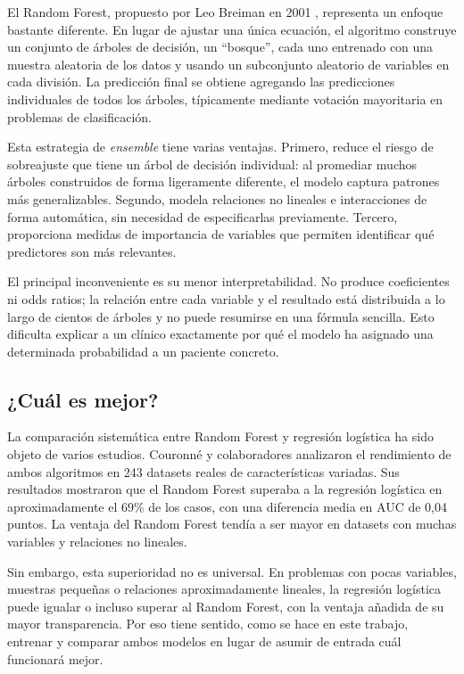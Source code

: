 \documentclass[12pt, a4paper, oneside]{report}
\begin{document}
El Random Forest, propuesto por Leo Breiman en 2001 \parencite{breiman2001rf}, representa un enfoque bastante diferente. En lugar de ajustar una única ecuación, el algoritmo construye un conjunto de árboles de decisión, un ``bosque'', cada uno entrenado con una muestra aleatoria de los datos y usando un subconjunto aleatorio de variables en cada división. La predicción final se obtiene agregando las predicciones individuales de todos los árboles, típicamente mediante votación mayoritaria en problemas de clasificación.

Esta estrategia de \textit{ensemble} tiene varias ventajas. Primero, reduce el riesgo de sobreajuste que tiene un árbol de decisión individual: al promediar muchos árboles construidos de forma ligeramente diferente, el modelo captura patrones más generalizables. Segundo, modela relaciones no lineales e interacciones de forma automática, sin necesidad de especificarlas previamente. Tercero, proporciona medidas de importancia de variables que permiten identificar qué predictores son más relevantes.

El principal inconveniente es su menor interpretabilidad. No produce coeficientes ni odds ratios; la relación entre cada variable y el resultado está distribuida a lo largo de cientos de árboles y no puede resumirse en una fórmula sencilla. Esto dificulta explicar a un clínico exactamente por qué el modelo ha asignado una determinada probabilidad a un paciente concreto.

\subsection{¿Cuál es mejor?}

La comparación sistemática entre Random Forest y regresión logística ha sido objeto de varios estudios. Couronné y colaboradores \parencite{couronne2018rflr} analizaron el rendimiento de ambos algoritmos en 243 datasets reales de características variadas. Sus resultados mostraron que el Random Forest superaba a la regresión logística en aproximadamente el 69\% de los casos, con una diferencia media en AUC de 0,04 puntos. La ventaja del Random Forest tendía a ser mayor en datasets con muchas variables y relaciones no lineales.

Sin embargo, esta superioridad no es universal. En problemas con pocas variables, muestras pequeñas o relaciones aproximadamente lineales, la regresión logística puede igualar o incluso superar al Random Forest, con la ventaja añadida de su mayor transparencia. Por eso tiene sentido, como se hace en este trabajo, entrenar y comparar ambos modelos en lugar de asumir de entrada cuál funcionará mejor.
\end{document}
